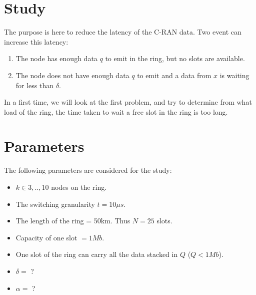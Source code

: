 \documentclass[a4paper,10pt]{article}
\begin{document}
\section*{Study}
The purpose is here to reduce the latency of the C-RAN data. Two event can increase this latency: 
\begin{enumerate}
  \item The node has enough data $q$ to emit in the ring, but no slots are available.
 \item The node does not have enough data $q$ to emit and a data from $x$ is waiting for less than $\delta$.
\end{enumerate}

In a first time, we will look at the first problem, and try to determine from what load of the ring, the time taken to wait a free slot in the ring is too long.

\section*{Parameters}
The following parameters are considered for the study:
\begin{itemize}
 \item $k \in {3,..,10}$ nodes on the ring.
 \item The switching granularity $t = 10\mu s$. 
 \item The length of the ring = 50km. Thus $N = 25$ slots.
 \item Capacity of one slot $= 1Mb$.
 \item One slot of the ring can carry all the data stacked in $Q$ ($Q < 1Mb$).
 \item $\delta =$ ?
 \item $\alpha =$ ?
\end{itemize}
\end{document}
